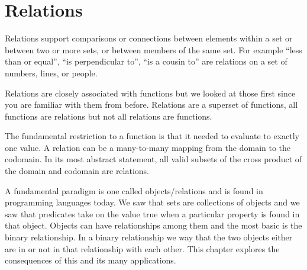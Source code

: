 






\chapter {Relations}
Relations support comparisons or connections between elements within a set or between two or more sets, or between members of the same set. For example ``less than or equal'', ``is perpendicular to'', ``is a cousin to'' are relations on a set of numbers, lines, or people. 

Relations are closely associated with functions but we looked at those first since you are familiar with them from before. Relations are a superset of functions, all functions are relations but not all relations are functions.

The fundamental restriction to a function is that it needed to evaluate to exactly one value. A relation can be a many-to-many mapping from the domain to the codomain. In its most abstract statement, all valid subsets of the cross product of the domain and codomain are relations.

A fundamental paradigm is one called objects/relations and is found in programming languages today. We saw that sets are collections of objects and we saw that predicates take on the value true when a particular property is found in that object. Objects can have relationships among them and the most basic is the binary relationship. In a binary relationship we way that the two objects either are in or not in that relationship with each other. This chapter explores the consequences of this and its many applications.



